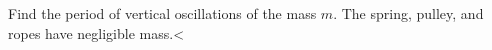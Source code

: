         Find the period of vertical oscillations of the mass $m$. The spring, pulley,
        and ropes have negligible mass.<%
